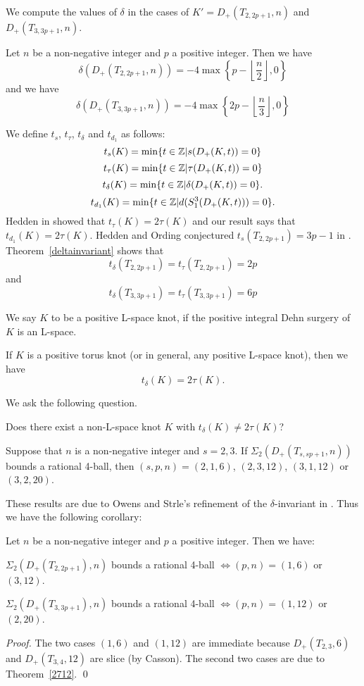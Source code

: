 \documentclass[11pt]{amsart}
\begin{document}
We compute the values of $\delta$ in the cases of $K'=D_+(T_{2,2p+1},n)$ and $D_+(T_{3,3p+1},n)$.
\begin{thm}
\label{deltainvariant}
Let $n$ be a non-negative integer and $p$ a positive integer.
Then we have 
$$\delta(D_+(T_{2,2p+1},n))=-4\max\left\{p-\left\lfloor\frac{n}{2}\right\rfloor,0\right\}$$
and we have 
$$\delta(D_+(T_{3,3p+1},n))=-4\max\left\{2p-\left\lfloor\frac{n}{3}\right\rfloor,0\right\}$$
\end{thm}
We define $t_s$, $t_\tau$, $t_\delta$ and $t_{d_1}$ as follows:
$$t_s(K)=\min\{t\in {\Bbb Z}|s(D_+(K,t))=0\}$$
$$t_\tau(K)=\min\{t\in {\Bbb Z}|\tau(D_+(K,t))=0\}$$
$$t_\delta(K)=\min\{t\in {\Bbb Z}|\delta(D_+(K,t))=0\}.$$
$$t_{d_1}(K)=\min\{t\in {\Bbb Z}|d(S^3_1(D_+(K,t)))=0\}.$$
Hedden in \cite{H} showed that $t_\tau(K)=2\tau(K)$ and our result says that $t_{d_1}(K)=2\tau(K)$.
Hedden and Ording conjectured $t_s(T_{2,2p+1})=3p-1$ in \cite{HO}.
Theorem~\ref{deltainvariant} shows that 
$$t_\delta(T_{2,2p+1})=t_\tau(T_{2,2p+1})=2p$$
and 
$$t_\delta(T_{3,3p+1})=t_\tau(T_{3,3p+1})=6p$$

We say $K$ to be a positive L-space knot, if the positive integral Dehn surgery of $K$ is an L-space.
\begin{thm}
\label{lspathm}
If $K$ is a positive torus knot (or in general, any positive L-space knot), then we have
$$t_{\delta}(K)=2\tau(K).$$
\end{thm}
We ask the following question.
\begin{que}
Does there exist a non-L-space knot $K$ with $t_{\delta}(K)\neq 2\tau(K)$?
\end{que}
\begin{thm}
\label{RationalBall}
Suppose that $n$ is a non-negative integer and $s=2,3$.
If $\Sigma_2(D_+(T_{s,sp+1},n))$ bounds a rational 4-ball, then $(s,p,n)=(2,1,6)$, $(2,3,12)$, $(3,1,12)$ or $(3,2,20)$.
\end{thm}

These results are due to Owens and Strle's refinement of the $\delta$-invariant in \cite{Ow}.
Thus we have the following corollary:
\begin{cor}
\label{converse}
Let $n$ be a non-negative integer and $p$ a positive integer.
Then we have:
\begin{center}
$\Sigma_2(D_+(T_{2,2p+1}),n)$ bounds a rational 4-ball $\Leftrightarrow (p,n)=(1,6)$ or $(3,12)$.
\end{center}
\begin{center}
$\Sigma_2(D_+(T_{3,3p+1}),n)$ bounds a rational 4-ball $\Leftrightarrow (p,n)=(1,12)$ or $(2,20)$.
\end{center}
\end{cor}
\begin{proof}
The two cases $(1,6)$ and $(1,12)$ are immediate because $D_+(T_{2,3},6)$ and $D_+(T_{3,4},12)$ are slice (by Casson).
The second two cases are due to Theorem~\ref{2712}.
\qed\end{proof}
\end{document}
